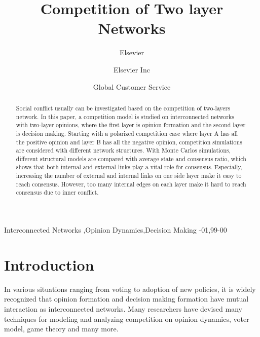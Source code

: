 \documentclass[review]{elsarticle}
\begin{document}
\begin{frontmatter}

\title{Competition of Two layer Networks}

\author{Elsevier}
\address{Radarweg 29, Amsterdam}

\author[mymainaddress,mysecondaryaddress]{Elsevier Inc}

\author[mysecondaryaddress]{Global Customer Service}

\address[mymainaddress]{1600 John F Kennedy Boulevard, Philadelphia}
\address[mysecondaryaddress]{360 Park Avenue South, New York}

\begin{abstract}
Social conflict usually can be investigated based on the competition of two-layers network. In this paper, a competition model is studied on interconnected networks with two-layer opinions, where the first layer is opinion formation and the second layer is decision making. Starting with a polarized competition case where layer A has all the positive opinion and layer B has all the negative opinion, competition simulations are considered with different network structures. With Monte Carlos simulations, different structural models are compared with average state and consensus ratio, which shows that both internal and external links play a vital role for consensus. Especially, increasing the number of external and internal links on one side layer make it easy to reach consensus. However, too many internal edges on each layer make it hard to reach consensus due to inner conflict.
\end{abstract}

\begin{keyword}
Interconnected Networks \sep Opinion Dynamics\sep Decision Making
-01\sep  99-00
\end{keyword}

\end{frontmatter}

\linenumbers

\section{Introduction}
In various situations ranging from voting to adoption of new policies, it is widely recognized that opinion formation and decision making formation have mutual interaction as interconnected networks\cite{bianconi2018,domenico2013,tomasini2015, kimsangwoo2012,newman2010,boccaletti2014,mikko2013,huberman2004}. Many researchers have devised many techniques for modeling and analyzing competition on opinion dynamics\cite{amato2017,quattrociocchi2014,haibo2017, hua2014}, voter model\cite{redner2017}, game theory\cite{smyrnakis2019} and many more\cite{danziger2019,namkhanhvu2017,laguna2004,masuda2015,zuev2012, shenyu2018, zhou2018}.  
\end{document}
